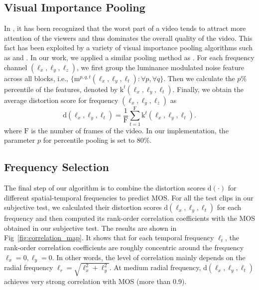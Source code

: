 \documentclass{sig-alternate}
\begin{document}
\subsection{Visual Importance Pooling}
In \cite{MooBov2009,ParSesLeeBov2013}, it has been recognized that the worst part of a video tends to attract more attention of the viewers and thus dominates the overall quality of the video. This fact has been exploited by a variety of visual importance pooling algorithms such as \cite{MooBov2009} and \cite{PinWol2004}. In our work, we applied a similar pooling method as \cite{MooBov2009}. For each frequency channel $(\ell_x,\ell_y,\ell_z)$, we first group the luminance modulated noise feature across all blocks, i.e., $\{\mathrm{m}^{p,q,t}(\ell_x,\ell_y,\ell_t): \forall p, \forall q\}$. Then we calculate the $p\%$ percentile of the features, denoted by $\mathrm{k}^{t}(\ell_x,\ell_y,\ell_t)$. Finally, we obtain the average distortion score for frequency $(\ell_x,\ell_y,\ell_z)$ as 
\begin{equation}
\mathrm{d}(\ell_x,\ell_y,\ell_t) = \frac{1}{\mathrm{F}}\sum_{t=1}^\mathrm{F}{\mathrm{k}^{t}(\ell_x,\ell_y,\ell_t)}. 
\end{equation}
where $\mathrm{F}$ is the number of frames of the video. In our implementation, the parameter $p$ for percentile pooling is set to 80\%.

\subsection{Frequency Selection}
The final step of our algorithm is to combine the distortion scores $\mathrm{d}(\cdot)$ for different spatial-temporal frequencies to predict MOS. For all the test clips in our subjective test, we calculated their distortion scores  $\mathrm{d}(\ell_x,\ell_y,\ell_t)$ for each frequency and then computed its rank-order correlation coefficients with the MOS obtained in our subjective test. The results are shown in Fig~\ref{fig:correlation_map}. It shows that for each temporal frequency $\ell_t$, the rank-order correlation coefficients are roughly concentric around the frequency $\ell_x=0,\ell_y=0$. In other words, the level of correlation mainly depends on the radial frequency $\ell_r=\sqrt{\ell_x^2 +\ell_y^2}$. At medium radial frequency, $\mathrm{d}(\ell_x,\ell_y,\ell_t)$ achieves very strong correlation with MOS (more than 0.9).
\end{document}
